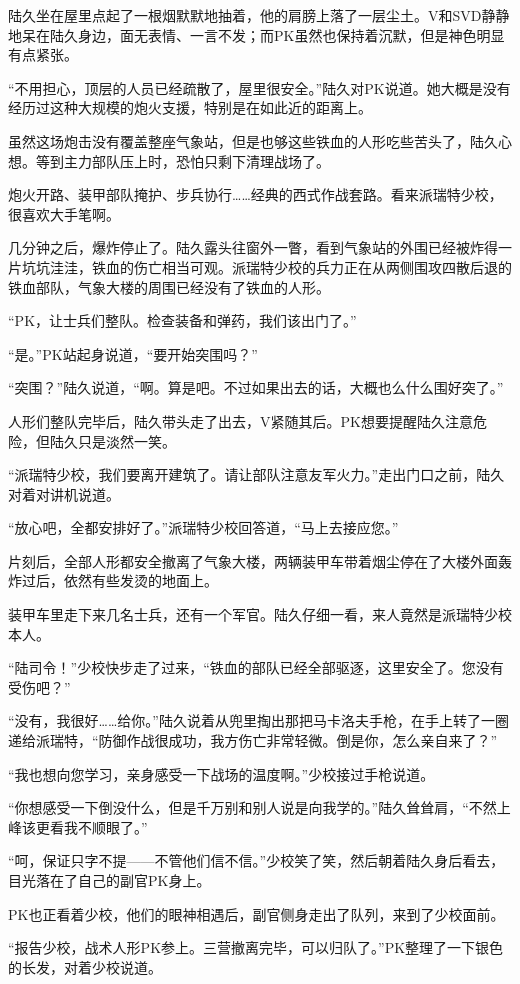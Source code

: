 陆久坐在屋里点起了一根烟默默地抽着，他的肩膀上落了一层尘土。V和SVD静静地呆在陆久身边，面无表情、一言不发；而PK虽然也保持着沉默，但是神色明显有点紧张。

“不用担心，顶层的人员已经疏散了，屋里很安全。”陆久对PK说道。她大概是没有经历过这种大规模的炮火支援，特别是在如此近的距离上。

虽然这场炮击没有覆盖整座气象站，但是也够这些铁血的人形吃些苦头了，陆久心想。等到主力部队压上时，恐怕只剩下清理战场了。

炮火开路、装甲部队掩护、步兵协行……经典的西式作战套路。看来派瑞特少校，很喜欢大手笔啊。

几分钟之后，爆炸停止了。陆久露头往窗外一瞥，看到气象站的外围已经被炸得一片坑坑洼洼，铁血的伤亡相当可观。派瑞特少校的兵力正在从两侧围攻四散后退的铁血部队，气象大楼的周围已经没有了铁血的人形。

“PK，让士兵们整队。检查装备和弹药，我们该出门了。”

“是。”PK站起身说道，“要开始突围吗？”

“突围？”陆久说道，“啊。算是吧。不过如果出去的话，大概也么什么围好突了。”

人形们整队完毕后，陆久带头走了出去，V紧随其后。PK想要提醒陆久注意危险，但陆久只是淡然一笑。

“派瑞特少校，我们要离开建筑了。请让部队注意友军火力。”走出门口之前，陆久对着对讲机说道。

“放心吧，全都安排好了。”派瑞特少校回答道，“马上去接应您。”

片刻后，全部人形都安全撤离了气象大楼，两辆装甲车带着烟尘停在了大楼外面轰炸过后，依然有些发烫的地面上。

装甲车里走下来几名士兵，还有一个军官。陆久仔细一看，来人竟然是派瑞特少校本人。

“陆司令！”少校快步走了过来，“铁血的部队已经全部驱逐，这里安全了。您没有受伤吧？”

“没有，我很好……给你。”陆久说着从兜里掏出那把马卡洛夫手枪，在手上转了一圈递给派瑞特，“防御作战很成功，我方伤亡非常轻微。倒是你，怎么亲自来了？”

“我也想向您学习，亲身感受一下战场的温度啊。”少校接过手枪说道。

“你想感受一下倒没什么，但是千万别和别人说是向我学的。”陆久耸耸肩，“不然上峰该更看我不顺眼了。”

“呵，保证只字不提——不管他们信不信。”少校笑了笑，然后朝着陆久身后看去，目光落在了自己的副官PK身上。

PK也正看着少校，他们的眼神相遇后，副官侧身走出了队列，来到了少校面前。

“报告少校，战术人形PK参上。三营撤离完毕，可以归队了。”PK整理了一下银色的长发，对着少校说道。

